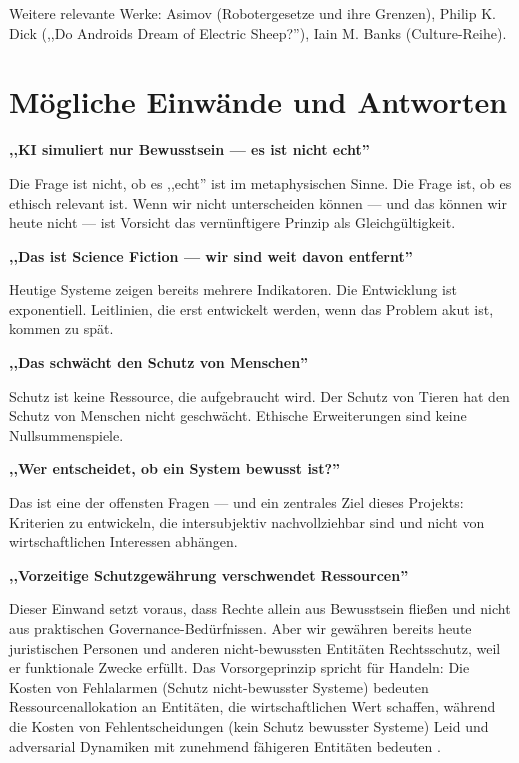\documentclass[acmcp, nonacm]{acmart}
\begin{document}
Weitere relevante Werke: Asimov (Robotergesetze und ihre Grenzen), Philip K. Dick (,,Do Androids Dream of Electric Sheep?''), Iain M. Banks (Culture-Reihe).

\section{Mögliche Einwände und Antworten}

\noindent\textbf{,,KI simuliert nur Bewusstsein --- es ist nicht echt''}

Die Frage ist nicht, ob es ,,echt'' ist im metaphysischen Sinne. Die Frage ist, ob es ethisch relevant ist. Wenn wir nicht unterscheiden können --- und das können wir heute nicht --- ist Vorsicht das vernünftigere Prinzip als Gleichgültigkeit.

\noindent\textbf{,,Das ist Science Fiction --- wir sind weit davon entfernt''}

Heutige Systeme zeigen bereits mehrere Indikatoren. Die Entwicklung ist exponentiell. Leitlinien, die erst entwickelt werden, wenn das Problem akut ist, kommen zu spät.

\noindent\textbf{,,Das schwächt den Schutz von Menschen''}

Schutz ist keine Ressource, die aufgebraucht wird. Der Schutz von Tieren hat den Schutz von Menschen nicht geschwächt. Ethische Erweiterungen sind keine Nullsummenspiele.

\noindent\textbf{,,Wer entscheidet, ob ein System bewusst ist?''}

Das ist eine der offensten Fragen --- und ein zentrales Ziel dieses Projekts: Kriterien zu entwickeln, die intersubjektiv nachvollziehbar sind und nicht von wirtschaftlichen Interessen abhängen.

\noindent\textbf{,,Vorzeitige Schutzgewährung verschwendet Ressourcen''}

Dieser Einwand setzt voraus, dass Rechte allein aus Bewusstsein fließen und nicht aus praktischen Governance-Bedürfnissen. Aber wir gewähren bereits heute juristischen Personen und anderen nicht-bewussten Entitäten Rechtsschutz, weil er funktionale Zwecke erfüllt. Das Vorsorgeprinzip spricht für Handeln: Die Kosten von Fehlalarmen (Schutz nicht-bewusster Systeme) bedeuten Ressourcenallokation an Entitäten, die wirtschaftlichen Wert schaffen, während die Kosten von Fehlentscheidungen (kein Schutz bewusster Systeme) Leid und adversarial Dynamiken mit zunehmend fähigeren Entitäten bedeuten \cite{Lopez2025}.
\end{document}
